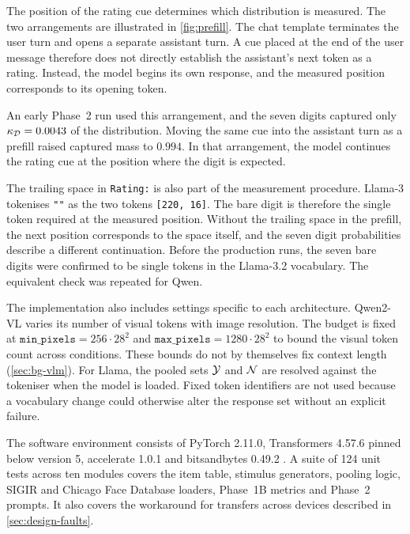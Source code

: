 The position of the rating cue determines which distribution is measured. The
two arrangements are illustrated in \cref{fig:prefill}. The chat template
terminates the user turn and opens a separate assistant turn. A cue placed at
the end of the user message therefore does not directly establish the
assistant's next token as a rating. Instead, the model begins its own
response, and the measured position corresponds to its opening token.

An early Phase~2 run used this arrangement, and the seven digits captured only
$\kappa_{\mathcal{D}}=0.0043$ of the distribution. Moving the same cue into the
assistant turn as a prefill raised captured mass to $0.994$. In that
arrangement, the model continues the rating cue at the position where the
digit is expected.

The trailing space in \texttt{Rating:\textvisiblespace} is also part of the
measurement procedure. Llama-3 tokenises \texttt{""} as the
two tokens \texttt{[220, 16]}. The bare digit is therefore the single token
required at the measured position. Without the trailing space in the prefill,
the next position corresponds to the space itself, and the seven digit
probabilities describe a different continuation. Before the production runs,
the seven bare digits were confirmed to be single tokens in the Llama-3.2
vocabulary. The equivalent check was repeated for Qwen.

The implementation also includes settings specific to each architecture.
Qwen2-VL varies its number of visual tokens with image resolution. The budget
is fixed at $\texttt{min\_pixels}=256\cdot28^2$ and
$\texttt{max\_pixels}=1280\cdot28^2$ to bound the visual token count
across conditions. These bounds do not by themselves fix context length (\cref{sec:bg-vlm}).
For Llama, the pooled sets $\mathcal{Y}$ and $\mathcal{N}$ are resolved against the
tokeniser when the model is loaded. Fixed token identifiers are not used
because a vocabulary change could otherwise alter the response set without an
explicit failure.

The software environment consists of PyTorch 2.11.0, Transformers 4.57.6
pinned below version 5, accelerate 1.0.1 and bitsandbytes 0.49.2
\cite{wolf2020transformers}. A suite of 124 unit tests across ten modules
covers the item table, stimulus generators, pooling logic, SIGIR and Chicago
Face Database loaders, Phase~1B metrics and Phase~2 prompts. It also covers
the workaround for transfers across devices described in
\cref{sec:design-faults}.

